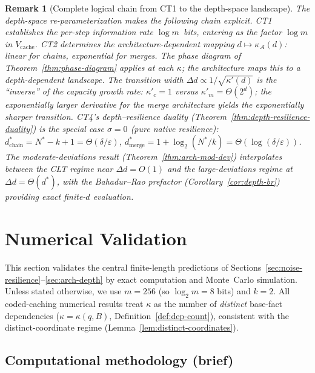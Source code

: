 \documentclass[journal]{IEEEtran}
\newtheorem{remark}{Remark}[section]
\numberwithin{equation}{section}
\begin{document}
\begin{remark}[Complete logical chain from CT1 to the
  depth-space landscape]
\label{rem:ct2-ct4-ds}
The depth-space re-parameterization makes the following
chain explicit.
CT1 establishes the per-step information rate
$\log m$~bits, entering as the factor $\log m$ in
$V_{\mathrm{cache}}$.
CT2 determines the architecture-dependent mapping
$d\mapsto\kappa_{\mathcal A}(d)$: linear for chains,
exponential for merges.
The phase diagram of
Theorem~\textup{\ref{thm:phase-diagram}} applies at each
$\kappa$; the architecture maps this to a
depth-dependent landscape.
The transition width
$\Delta d\propto 1/\sqrt{\kappa'(d)}$ is the ``inverse''
of the capacity growth rate: $\kappa'_c=1$ versus
$\kappa'_m=\Theta(2^d)$;
the exponentially larger derivative for the merge
architecture yields the exponentially sharper transition.
CT4's depth--resilience duality
\textup{(Theorem~\ref{thm:depth-resilience-duality})} is
the special case $\sigma=0$ \textup{(}pure native
resilience\textup{)}:
$d^*_{\mathrm{chain}}=N^*-k+1=\Theta(\delta/\varepsilon)$,
$d^*_{\mathrm{merge}}
=1+\log_2(N^*/k)=\Theta(\log(\delta/\varepsilon))$.
The moderate-deviations result
\textup{(Theorem~\ref{thm:arch-mod-dev})} interpolates
between the CLT regime near $\Delta d=O(1)$ and the
large-deviations regime at $\Delta d=\Theta(d^*)$, with
the Bahadur--Rao prefactor
\textup{(Corollary~\ref{cor:depth-br})} providing exact
finite-$d$ evaluation.
\end{remark}


\section{Numerical Validation}
\label{sec:numerical}

This section validates the central finite-length predictions of
Sections~\ref{sec:noise-resilience}--\ref{sec:arch-depth} by exact computation
and Monte~Carlo simulation.
Unless stated otherwise, we use \(m=256\) (so \(\log_2 m=8\) bits) and \(k=2\).
All coded-caching numerical results treat \(\kappa\) as the number of
\emph{distinct} base-fact dependencies
(\(\kappa=\kappa(q,B)\), Definition~\ref{def:dep-count}), consistent with the
distinct-coordinate regime (Lemma~\ref{lem:distinct-coordinates}).

\subsection{Computational methodology (brief)}
\label{subsec:comp-methodology}
\end{document}
